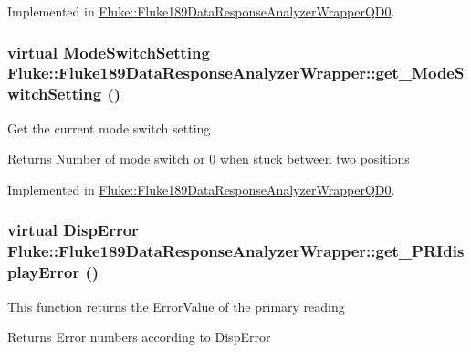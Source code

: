 Implemented in \hyperlink{classFluke_1_1Fluke189DataResponseAnalyzerWrapperQD0_a8a50c55ebd21461e4c934a1eb4b07641}{Fluke::Fluke189DataResponseAnalyzerWrapperQD0}.\hypertarget{classFluke_1_1Fluke189DataResponseAnalyzerWrapper_a18e1b686e50a4cc3a7023c646f66a35c}{
\subsubsection[{get\_\-ModeSwitchSetting}]{\setlength{\rightskip}{0pt plus 5cm}virtual {\bf ModeSwitchSetting} Fluke::Fluke189DataResponseAnalyzerWrapper::get\_\-ModeSwitchSetting ()}}
\label{classFluke_1_1Fluke189DataResponseAnalyzerWrapper_a18e1b686e50a4cc3a7023c646f66a35c}
Get the current mode switch setting \begin{DoxyReturn}{Returns}
Number of mode switch or 0 when stuck between two positions 
\end{DoxyReturn}


Implemented in \hyperlink{classFluke_1_1Fluke189DataResponseAnalyzerWrapperQD0_ad28a17399ffe6a926990aafd5a1891d3}{Fluke::Fluke189DataResponseAnalyzerWrapperQD0}.\hypertarget{classFluke_1_1Fluke189DataResponseAnalyzerWrapper_ae6b5bf434d9600f4178650d66922a3aa}{
\subsubsection[{get\_\-PRIdisplayError}]{\setlength{\rightskip}{0pt plus 5cm}virtual {\bf DispError} Fluke::Fluke189DataResponseAnalyzerWrapper::get\_\-PRIdisplayError ()}}
\label{classFluke_1_1Fluke189DataResponseAnalyzerWrapper_ae6b5bf434d9600f4178650d66922a3aa}
This function returns the ErrorValue of the primary reading \begin{DoxyReturn}{Returns}
Error numbers according to DispError 
\end{DoxyReturn}


